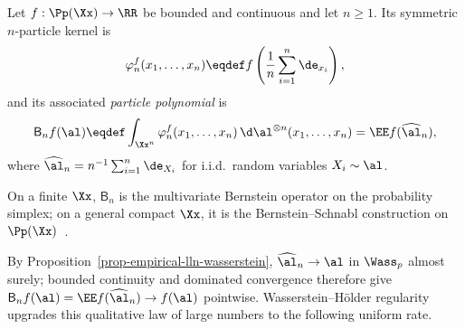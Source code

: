\begin{defn}\label{def-particle-polynomial}
	Let \(f:\Pp(\Xx)\to\RR\) be bounded and continuous and let \(n\geq1\). Its symmetric \(n\)-particle kernel is
	\[
		\varphi_n^f(x_1,\ldots,x_n)
		\eqdef
		f\left(\frac1n\sum_{i=1}^n\de_{x_i}\right),
	\]
	and its associated \emph{particle polynomial} is
	\begin{equation}\label{eq-empirical-particle-polynomial}
		\mathsf B_n f(\al)
		\eqdef
		\int_{\Xx^n}\varphi_n^f(x_1,\ldots,x_n)
		\,\d\al^{\otimes n}(x_1,\ldots,x_n)
		=
		\EE f(\widehat\al_n),
	\end{equation}
	where \(\widehat\al_n=n^{-1}\sum_{i=1}^n\de_{X_i}\) for i.i.d.\ random variables \(X_i\sim\al\).
\end{defn}

On a finite \(\Xx\), \(\mathsf B_n\) is the multivariate Bernstein operator on the probability simplex; on a general compact \(\Xx\), it is the Bernstein--Schnabl construction on \(\Pp(\Xx)\)~\cite{schnabl1969bernstein}.

By Proposition~\ref{prop-empirical-lln-wasserstein}, \(\widehat\al_n\to\al\) in \(\Wass_p\) almost surely; bounded continuity and dominated convergence therefore give \(\mathsf B_n f(\al)=\EE f(\widehat\al_n)\to f(\al)\) pointwise. Wasserstein--H\"older regularity upgrades this qualitative law of large numbers to the following uniform rate.

